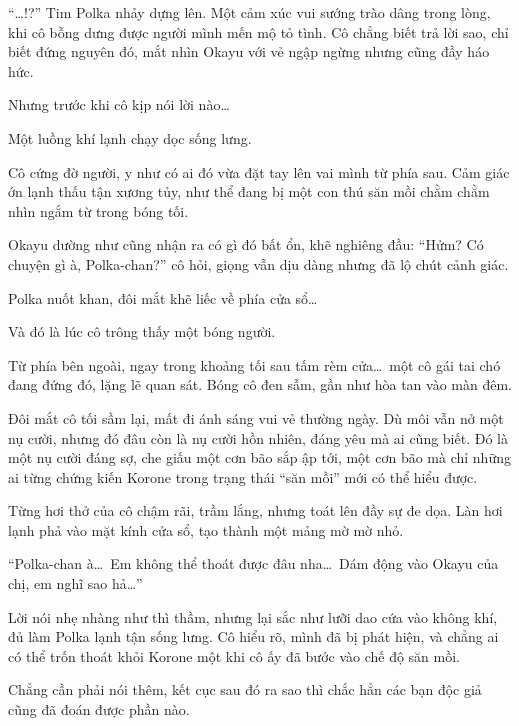 \documentclass[../main.tex]{subfiles}
\begin{document}
``\dots !?'' Tim Polka nhảy dựng lên. Một cảm xúc vui sướng trào dâng trong lòng, khi cô bỗng dưng được người mình mến mộ tỏ tình. Cô chẳng biết trả lời sao, chỉ biết đứng nguyên đó, mắt nhìn Okayu với vẻ ngập ngừng nhưng cũng đầy háo hức.

Nhưng trước khi cô kịp nói lời nào\dots

Một luồng khí lạnh chạy dọc sống lưng.

Cô cứng đờ người, y như có ai đó vừa đặt tay lên vai mình từ phía sau. Cảm giác ớn lạnh thấu tận xương tủy, như thể đang bị một con thú săn mồi chằm chằm nhìn ngắm từ trong bóng tối.

Okayu dường như cũng nhận ra có gì đó bất ổn, khẽ nghiêng đầu: ``Hửm? Có chuyện gì à, Polka-chan?'' cô hỏi, giọng vẫn dịu dàng nhưng đã lộ chút cảnh giác.

Polka nuốt khan, đôi mắt khẽ liếc về phía cửa sổ\dots

Và đó là lúc cô trông thấy một bóng người.

Từ phía bên ngoài, ngay trong khoảng tối sau tấm rèm cửa\dots\ một cô gái tai chó đang đứng đó, lặng lẽ quan sát. Bóng cô đen sẫm, gần như hòa tan vào màn đêm.

Đôi mắt cô tối sầm lại, mất đi ánh sáng vui vẻ thường ngày. Dù môi vẫn nở một nụ cười, nhưng đó đâu còn là nụ cười hồn nhiên, đáng yêu mà ai cũng biết. Đó là một nụ cười đáng sợ, che giấu một cơn bão sắp ập tới, một cơn bão mà chỉ những ai từng chứng kiến Korone trong trạng thái ``săn mồi'' mới có thể hiểu được.

Từng hơi thở của cô chậm rãi, trầm lắng, nhưng toát lên đầy sự đe dọa. Làn hơi lạnh phả vào mặt kính cửa sổ, tạo thành một mảng mờ mờ nhỏ.

``Polka-chan à\dots\ Em không thể thoát được đâu nha\dots\ Dám động vào Okayu của chị, em nghĩ sao hả\dots''

Lời nói nhẹ nhàng như thì thầm, nhưng lại sắc như lưỡi dao cứa vào không khí, đủ làm Polka lạnh tận sống lưng. Cô hiểu rõ, mình đã bị phát hiện, và chẳng ai có thể trốn thoát khỏi Korone một khi cô ấy đã bước vào chế độ săn mồi.

Chẳng cần phải nói thêm, kết cục sau đó ra sao thì chắc hẳn các bạn độc giả cũng đã đoán được phần nào.
\end{document}
